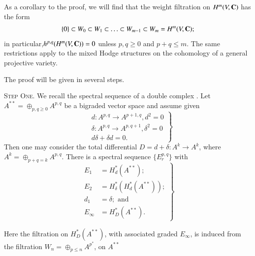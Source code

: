 As a corollary to the proof, we will find that the weight filtration on $H^m (V, \mathbf{C})$ has the form 
$$
\{0\} \subset W_0 \subset W_1 \subset \ldots \subset W_{m-1} \subset W_m  = H^m (V, \mathbf{C}); 
$$
in particular,\pageoriginale $h^{p,q} (H^m (V, \mathbf{C})) =0$ unless $p, q \geqslant 0$ and $p+q \leqslant m$. The same restrictions apply to the mixed Hodge structures on the cohomology of a general projective variety.

The proof will be given in several steps.

\textsc{Step One.} We recall the spectral sequence of a double complex \cite{art4-key17}. Let $A^{\ast \ast} = \oplus_{p,q \geqslant 0} A^{p,q}$ be a bigraded vector space and assume given
\begin{equation}
\left.
\begin{aligned}
& d : A^{p,q} \to A^{p+1, q}, d^2 = 0\\
&  \delta : A^{p,q} \to A^{p, q+1} , \delta^2 =0\\
& d \delta +\delta d = 0.
\end{aligned} 
\right\}
\label{art4-eq4.3}
\end{equation}
Then one may consider the total differential $D = d + \delta : A^k \to A^k$, where $A^k = \oplus_{p+q = k} A^{p,q}$. There is a spectral sequence $\{E^{p,q}_r\}$ with
\begin{equation}
\left.
\begin{aligned}
E_1 & = H^\ast_d (A^{\ast \ast}); \\
E_2 & = H^\ast_{\delta} (H^\ast_d (A^{\ast \ast}));\\
d_1 & = \delta; \text{ and }\\
E_\infty & = H^\ast_D (A^{\ast \ast}).
\end{aligned}
\right\}
\label{art4-eq4.4}         
\end{equation}

Here the filtration on $H^\ast_D (A^{\ast\ast})$, with associated graded $E_\infty$, is induced from the filtration $W_n = \oplus_{p \leqslant n} A^{p^\ast}$, on $A^{\ast\ast}$

